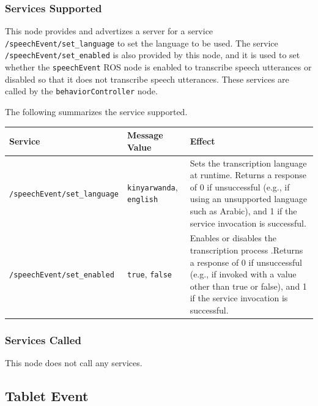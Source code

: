 \documentclass{CSSRforAfrica}
\begin{document}
{\subsubsection*{Services Supported}

This node  provides and advertizes a server for a service {\small \verb+/speechEvent/set_language+} to set the language to be used. The service {\small \verb+/speechEvent/set_enabled+} is also provided by this node, and it is used to set whether the  {\small \verb+speechEvent+} ROS node is enabled to transcribe speech utterances or disabled so that it does not transcribe speech utterances. These services are called by  the {\small \verb+behaviorController+} node.

The following summarizes the service supported.

\begin{center}
\begin{tabularx}{\linewidth}{| l | l | X|}
\hline 
{\small Service }                                                                                & {\small Message Value}    &  {\small Effect}       \\
\hline
{\footnotesize \verb+/speechEvent/set_language+ }  & {\footnotesize \verb+kinyarwanda+, \verb+english+} & {\small Sets the transcription language at runtime. Returns a response of 0 if unsuccessful (e.g., if using an unsupported language such as Arabic), and 1 if the service invocation is successful.} \\ 
\hline
{\footnotesize \verb+/speechEvent/set_enabled+ }  & {\footnotesize \verb+true+, \verb+false+} & {\small Enables or disables the transcription process .Returns a response of 0 if unsuccessful (e.g., if invoked with a value other than true or false), and 1 if the service invocation is successful.} \\ 
\hline
\end{tabularx}
\end{center}


\subsubsection*{Services Called}
This node does not call any services.






\newpage

\subsection{Tablet Event }

}
\end{document}
